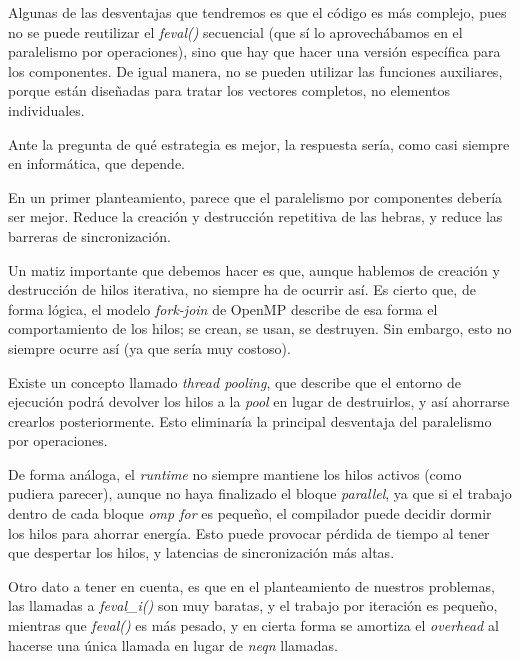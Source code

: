 Algunas de las desventajas que tendremos es que el código es más complejo, pues no se puede reutilizar el \textit{feval()} secuencial (que sí lo aprovechábamos en el paralelismo por operaciones), sino que hay que hacer una versión específica para los componentes. De igual manera, no se pueden utilizar las funciones auxiliares, porque están diseñadas para tratar los vectores completos, no elementos individuales.


Ante la pregunta de qué estrategia es mejor, la respuesta sería, como casi siempre en informática, que depende.

En un primer planteamiento, parece que el paralelismo por componentes debería ser mejor. Reduce la creación y destrucción repetitiva de las hebras, y reduce las barreras de sincronización.

Un matiz importante que debemos hacer es que, aunque hablemos de creación y destrucción de hilos iterativa, no siempre ha de ocurrir así. Es cierto que, de forma lógica, el modelo \textit{fork-join} de OpenMP describe de esa forma el comportamiento de los hilos; se crean, se usan, se destruyen. \cite{Jin1997} Sin embargo, esto no siempre ocurre así (ya que sería muy costoso).

Existe un concepto llamado \textit{thread pooling}, que describe que el entorno de ejecución podrá devolver los hilos a la \textit{pool} en lugar de destruirlos, y así ahorrarse crearlos posteriormente. \cite{Barlas2023} Esto eliminaría la principal desventaja del paralelismo por operaciones. 

De forma análoga, el \textit{runtime} no siempre mantiene los hilos activos (como pudiera parecer), aunque no haya finalizado el bloque \textit{parallel}, ya que si el trabajo dentro de cada bloque \textit{omp for} es pequeño, el compilador puede decidir dormir los hilos para ahorrar energía. Esto puede provocar pérdida de tiempo al tener que despertar los hilos, y latencias de sincronización más altas.

Otro dato a tener en cuenta, es que en el planteamiento de nuestros problemas, las llamadas a \textit{feval\_i()} son muy baratas, y el trabajo por iteración es pequeño, mientras que \textit{feval()} es más pesado, y en cierta forma se amortiza el \textit{overhead} al hacerse  una única llamada en lugar de \textit{neqn} llamadas.

